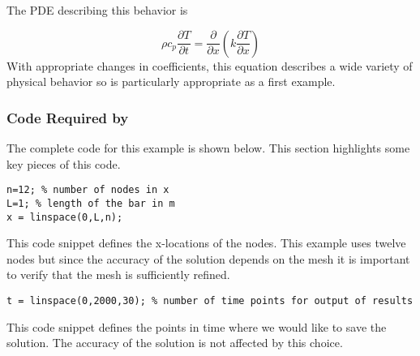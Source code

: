 \documentclass{article}
\begin{document}
The PDE describing this behavior is 

\begin{equation}\label{eq:heat_pde}
	\rho c_p \frac{\partial T}{\partial t} = 
	\frac{\partial}{\partial x}\left(k\frac{\partial T}{\partial x}\right)
\end{equation}
With appropriate changes in coefficients, this equation describes a wide
variety of physical behavior so is particularly appropriate as a first example.

\subsubsection{Code Required by \pde}
The complete code for this example is shown below. This section highlights 
some key pieces of this code.

\begin{lstlisting}
n=12; % number of nodes in x
L=1; % length of the bar in m
x = linspace(0,L,n);
\end{lstlisting}
This code snippet defines the x-locations of the nodes. This example uses
twelve nodes but since the accuracy of the solution depends on the mesh it
is important to verify that the mesh is sufficiently refined. 

\begin{lstlisting}
t = linspace(0,2000,30); % number of time points for output of results
\end{lstlisting}
This code snippet defines the points in time where we would like to save the
solution. The accuracy of the solution is not affected by this choice.
\end{document}
